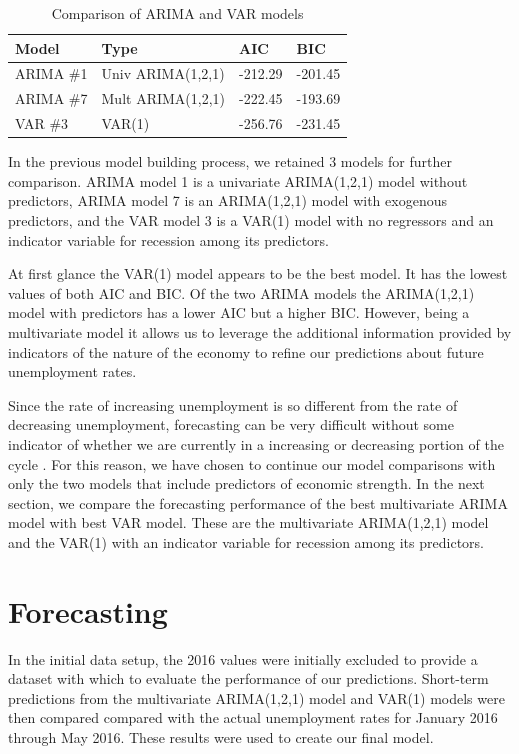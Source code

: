 \documentclass[twoside,twocolumn]{article}
\begin{document}
\begin{table}[H]
\centering
\caption{Comparison of ARIMA and VAR models}
\begin{tabular}{llll}
  \hline
Model & Type & AIC & BIC \\ 
  \hline
ARIMA \#1 &Univ ARIMA(1,2,1) &   -212.29 & -201.45  \\ 
ARIMA \#7 & Mult ARIMA(1,2,1)  & -222.45 & -193.69   \\ 
VAR \#3 & VAR(1) & -256.76 & -231.45 \\ 
   \hline
\end{tabular}
\end{table}


In the previous model building process, we retained 3 models for further comparison. ARIMA model 1 is a univariate ARIMA(1,2,1) model without predictors, ARIMA model 7 is an ARIMA(1,2,1) model with exogenous predictors, and the VAR model 3 is a VAR(1) model with no regressors and an indicator variable for recession among its predictors.

At first glance the VAR(1) model appears to be the best model.  It has the lowest values of both AIC and BIC.  Of the two ARIMA models the ARIMA(1,2,1) model with predictors has a lower AIC but a higher BIC. However, being a multivariate model it	 allows us to leverage the additional information provided by indicators of the nature of the economy to refine our predictions about future unemployment rates. 

Since the rate of increasing unemployment is so different from the rate of decreasing unemployment, forecasting can be very difficult without some indicator of whether we are currently in a increasing or decreasing portion of the cycle \citep{Montgomery1998}. For this reason, we have chosen to continue our model comparisons with only the two models that include predictors of economic strength. In the next section, we compare the forecasting performance of the best multivariate ARIMA model with best VAR model. These are the multivariate ARIMA(1,2,1) model and the VAR(1) with an indicator variable for recession among its predictors.


\section{Forecasting}

In the initial data setup, the 2016 values were initially excluded to provide a dataset with which to evaluate the performance of our predictions. Short-term predictions from the multivariate ARIMA(1,2,1) model and VAR(1) models were then compared compared with the actual unemployment rates for January 2016 through May 2016. These results were used to create our final model.
\end{document}
